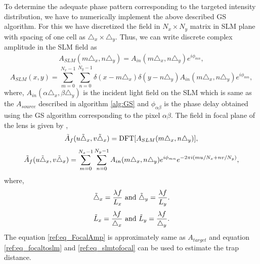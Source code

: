 To determine the adequate phase pattern corresponding to the targeted intensity distribution, we have to numerically implement the above described GS algorithm. For this we have discretized the field in $N_x \times N_y$ matrix in SLM plane with spacing of one cell as $\triangle_x \times \triangle_y$. Thus, we can write discrete complex amplitude in the SLM field as
\begin{eqnarray}
    \label{eq:discrete_A_slm}
    A_{SLM}(m\triangle_x,n\triangle_y) = A_{in}(m \triangle_x, n \triangle_y)e^{i\phi_{mn}},
\end{eqnarray}
\begin{equation}
    A_{SLM}(x,y) = \sum_{m=0}^{N_x-1}\sum_{n=0}^{N_y-1} \delta(x-m \triangle_x) \delta(y-n \triangle_y) A_{in}(m \triangle_x, n \triangle_y)e^{i\phi_{mn}},
\end{equation}
where, $A_{in}(\alpha \triangle_x, \beta \triangle_y)$ is the incident light field on the SLM which is same as the $A_{source}$ described in algorithm \ref{alg:GS} and $\phi_{\alpha \beta}$ is the phase delay obtained using the GS algorithm corresponding to the pixel $\alpha \beta$.
The field in focal plane of the lens is given by \cite{khare2015fourier, nla.cat-vn592477},
\begin{eqnarray}
    \Tilde{A}_f(u \Tilde{\triangle}_x, v \Tilde{\triangle}_x) =  \text{DFT}[A_{SLM}(m\triangle_x,n\triangle_y)],
\end{eqnarray}
\begin{equation}
\label{ref:eq_FocalAmp}
    \Tilde{A}_f(u \Tilde{\triangle}_x, v \Tilde{\triangle}_x) = \sum_{m=0}^{N_x-1}\sum_{n=0}^{N_y-1} A_{in}(m \triangle_x, n \triangle_y)e^{i\phi_{mn}}e^{-2\pi i(mu/N_x + nv/N_y)},
\end{equation}
where, 
\begin{equation}
\label{ref:eq_focaltoslm}
    \Tilde{\triangle}_x=\frac{\lambda f}{L_x}\text{  and  } \Tilde{\triangle}_y=\frac{\lambda f}{L_y}.
\end{equation}
\begin{equation}
\label{ref:eq_slmtofocal}
    \Tilde{L}_x=\frac{\lambda f}{\triangle_x}\text{  and  } \Tilde{L}_y=\frac{\lambda f}{\triangle_y}.
\end{equation}
The equation \ref{ref:eq_FocalAmp} is approximately same as $A_{target}$ and equation \ref{ref:eq_focaltoslm} and \ref{ref:eq_slmtofocal} can be used to estimate the trap distance.







